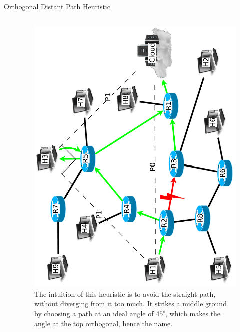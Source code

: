 \documentclass[pdftex]{beamer}
\begin{document}

\begin{frame}{Orthogonal Distant Path Heuristic}
\begin{columns}
\begin{column}{.5\textwidth}
\begin{algorithm}[H]
\DontPrintSemicolon
{}
\SetAlgoLined
\SetAlgoLongEnd
\scriptsize
{}
\caption{}
\small
\end{algorithm}
\end{column}
	
\begin{column}{.5\textwidth}
\begin{figure}
\includegraphics[height=\textwidth,angle=-90]{angular_path}
\caption{The intuition of this heuristic is to avoid the straight path, without diverging from it too much.  It strikes a middle ground by choosing a path at an ideal angle of $45^{\circ}$, which makes the angle at the top orthogonal, hence the name.}
\end{figure}
\end{column}

\end{columns}
\end{frame}
\end{document}
